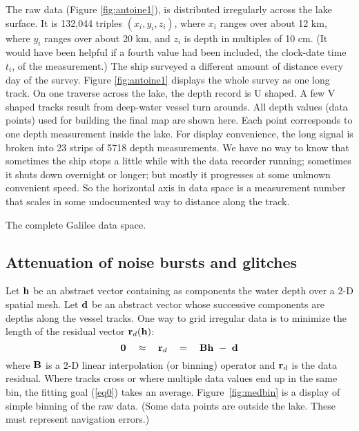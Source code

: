 \par
The raw data (Figure \ref{fig:antoine1}),
is distributed irregularly across the lake surface.
It is 132,044 triples $(x_i,y_i,z_i)$, where $x_i$ ranges over about 
12 km, where $y_i$ ranges over about 20 km,
and $z_i$ is depth in multiples of 10 cm.
(It would have been helpful if a fourth value had been included,
the clock-date time $t_i$, of the measurement.)
The ship surveyed a different amount of distance every day of the survey.
Figure \ref{fig:antoine1} displays the whole survey as one long track.
On one traverse across the lake, the depth record is U shaped.
A few V shaped tracks result from deep-water vessel turn arounds.
All depth values (data points) used for building the final map are shown here.
Each point corresponds to one depth measurement inside the lake.
For display convenience, the long signal is broken
into 23 strips of 5718 depth measurements.
We have no way to know that sometimes the ship stops a little while
with the data recorder running;
sometimes it shuts down overnight or longer;
but mostly it progresses at some unknown convenient speed.
So the horizontal axis in data space is a measurement number
that scales in some undocumented way to distance along the track.

 {
  The complete Galilee data space.}


\subsection{Attenuation of noise bursts and glitches}


Let $\bold{h}$ be an abstract vector containing as components
the water depth over a 2-D spatial mesh.
Let $\bold{d}$ be an abstract vector whose successive components
are depths along the vessel tracks.
One way to grid irregular data is to minimize the length 
of the residual vector $\bold r_d(\bold h)$:
\begin{equation}
	\bold 0 \quad\approx\quad \bold r_d \quad=\quad \bold B \bold h \ -\  \bold d    \label{eq0}
\end{equation}
where $\bold B$ is a 2-D linear interpolation (or binning) operator 
and $\bold r_d$ is the data residual.
Where tracks cross or where multiple data values end up in the same bin,
the fitting goal (\ref{eq0}) takes an average.
Figure~\ref{fig:medbin}
is a display of simple binning of the raw data.
(Some data points are outside the lake.
These must represent navigation errors.)


